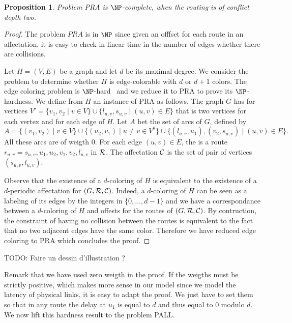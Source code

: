 \documentclass[a4paper,10pt]{article}
\newtheorem{proposition}{Proposition}
\newcommand{\todo}[1]{{\color{red} TODO: {#1}}}
\begin{document}
 \begin{proposition}
Problem PRA is $\NP$-complete, when the routing is of conflict depth two.
\end{proposition}
 \begin{proof}
 The problem $PRA$ is in $\NP$ since given an offfset for each route in an affectation, it is easy to check in linear time in the number of edges whether there are collisions.
 
  Let $H=(V,E)$ be a graph and let $d$ be its maximal degree. We consider the problem to determine whether $H$ is edge-colorable
  with $d$ or $d+1$ colors. The edge coloring problem is $\NP$-hard~\cite{holyer1981np} and we reduce it to PRA to prove its $\NP$-hardness. We define from $H$ an instance of PRA as follows. The graph $G$ has for vertices $V'= \{ v_1, v_2 \mid v \in V  \} \cup \{ l_{u,v}, s_{u,v} \mid (u,v) \in E \}$ that is two vertices for each vertex and for each edge of $H$. 
  Let $A$ bet the set of arcs of $G$, defined by 
  $$A = \{(v_1,v_2) \mid v\in V\} \cup \{(u_2,v_1)\mid u \neq v \in V^2\} \cup \{(l_{u,v},u_1),(v_2,s_{u,v}) \mid (u,v) \in E \}. $$
  All these arcs are of weigth $0$. 
  For each edge $(u,v) \in E$, the is a route $r_{u,v} = s_{u,v},u_1,u_2,v_1,v_2,l_{u,v}$ in ${\cal R}$.  
  The affectation ${\cal C}$ is the set of pair of vertices $(s_{u,v}, l_{u,v})$.
    
  Observe that the existence of a $d$-coloring of $H$ is equivalent to the existence of a $d$-periodic affectation
  for $(G,{\cal R},{\cal C})$. Indeed, a $d$-coloring of $H$ can be seen as a labeling of its edges by the integers
  in $\{0,\dots,d-1\}$ and we have a correspondance between a $d$-coloring of $H$ and offests for the routes of $(G,{\cal R},{\cal C})$.
  By contruction, the constraint of having no collision between the routes is equivalent to the fact that no two adjacent edges have
  the same color. Therefore we have reduced edge coloring to PRA which concludes the proof. 
 \end{proof}
 \todo{Faire un dessin d'illustration ?}
 
 Remark that we have used zero weigth in the proof. If the weigths must be strictly positive, which makes more sense in our model since
 we model the latency of physical links, it is easy to adapt the proof. We just have to set them so that in any route the delay at $u_1$ is equal to $d$ and thus equal to $0$ modulo $d$. We now lift this hardness result to the problem PALL.
\end{document}
